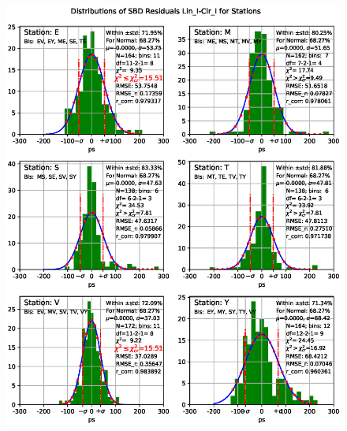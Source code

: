 \documentclass[letterpaper,twoside,12pt]{article}
\begin{document}
\begin{figure}[ht!]
  \begin{center}
  \includegraphics[width=33pc]{Distr_SBD_Lin_I-Cir_I_Diff_Stations.eps}
  \caption{\small }
  \label{dsbd_distr_st}
  \end{center}
\end{figure}
\end{document}
